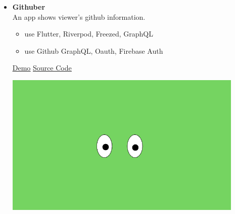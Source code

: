 \documentclass[a4paper,10pt]{article}
\begin{document}
\begin{itemize}[left=0pt, label={}]
    \vspace{10pt}
    \item
    \begin{minipage}[t]{0.5\textwidth}
        \vspace{0pt}
        \textbf{Githuber} \\
        An app shows viewer's github information.
        \vspace{0.5em}
        \begin{itemize}[left=0pt, label={--},itemsep=0.5em]
            \item use Flutter, Riverpod, Freezed, GraphQL
            \item use Github GraphQL, Oauth, Firebase Auth
        \end{itemize}
        \vspace{0.5em}
        \textcolor{customgreen}{\faExternalLink} \href{https://github.com/qaz5823091/githuber}{\underline{Demo}}
        \textcolor{customgreen}{\faGithub} \href{https://github.com/qaz5823091/githuber}{\underline{Source Code}}
    \end{minipage}%
    \hfill
    \begin{minipage}[t]{0.45\textwidth}
        \vspace{0pt}
        \centering
        \includegraphics[width=0.9\textwidth]{images/collections.png}
    \end{minipage}
    \vspace{2em}


\end{itemize}
\end{document}
